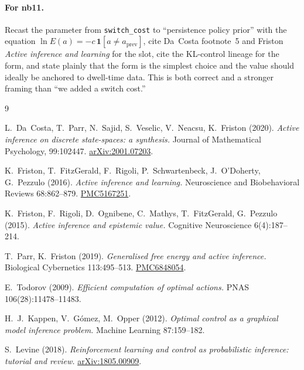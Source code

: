 \documentclass[11pt,a4paper]{article}
\theoremstyle{plain}
\begin{document}
\paragraph{For nb11.} Recast the parameter from \texttt{switch\_cost}
to ``persistence policy prior'' with the equation
$\ln E(a) = -c\,\mathbf{1}[a\neq a_{\mathrm{prev}}]$, cite Da~Costa
footnote~5 and Friston \emph{Active inference and learning} for the
slot, cite the KL-control lineage for the form, and state plainly that
the form is the simplest choice and the value should ideally be
anchored to dwell-time data. This is both correct and a stronger
framing than ``we added a switch cost.''

\begin{thebibliography}{9}

L.~Da~Costa, T.~Parr, N.~Sajid, S.~Veselic, V.~Neacsu, K.~Friston (2020).
\emph{Active inference on discrete state-spaces: a synthesis.}
Journal of Mathematical Psychology, 99:102447.
\href{https://arxiv.org/abs/2001.07203}{arXiv:2001.07203}.

K.~Friston, T.~FitzGerald, F.~Rigoli, P.~Schwartenbeck, J.~O'Doherty,
G.~Pezzulo (2016).
\emph{Active inference and learning.}
Neuroscience and Biobehavioral Reviews 68:862--879.
\href{https://pmc.ncbi.nlm.nih.gov/articles/PMC5167251/}{PMC5167251}.

K.~Friston, F.~Rigoli, D.~Ognibene, C.~Mathys, T.~FitzGerald,
G.~Pezzulo (2015).
\emph{Active inference and epistemic value.}
Cognitive Neuroscience 6(4):187--214.

T.~Parr, K.~Friston (2019).
\emph{Generalised free energy and active inference.}
Biological Cybernetics 113:495--513.
\href{https://pmc.ncbi.nlm.nih.gov/articles/PMC6848054/}{PMC6848054}.

E.~Todorov (2009).
\emph{Efficient computation of optimal actions.}
PNAS 106(28):11478--11483.

H.~J.~Kappen, V.~G\'omez, M.~Opper (2012).
\emph{Optimal control as a graphical model inference problem.}
Machine Learning 87:159--182.

S.~Levine (2018).
\emph{Reinforcement learning and control as probabilistic inference:
tutorial and review.}
\href{https://arxiv.org/abs/1805.00909}{arXiv:1805.00909}.

\end{thebibliography}
\end{document}
